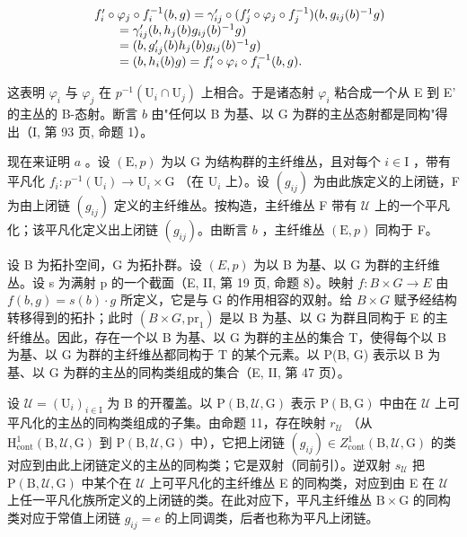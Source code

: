 \[
\begin{array}{r l} & f _ {i} ^ {\prime} \circ \varphi_ {j} \circ f _ {i} ^ {- 1} (b, g) = \gamma_ {i j} ^ {\prime} \circ (f _ {j} ^ {\prime} \circ \varphi_ {j} \circ f _ {j} ^ {- 1}) (b, g _ {i j} (b) ^ {- 1} g) \\ & \qquad = \gamma_ {i j} ^ {\prime} (b, h _ {j} (b) g _ {i j} (b) ^ {- 1} g) \\ & \qquad = (b, g _ {i j} ^ {\prime} (b) h _ {j} (b) g _ {i j} (b) ^ {- 1} g) \\ & \qquad = (b, h _ {i} (b) g) = f _ {i} ^ {\prime} \circ \varphi_ {i} \circ f _ {i} ^ {- 1} (b, g). \end{array}
\]

这表明 \(\varphi_{i}\) 与 \(\varphi_{j}\) 在 \(p^{-1}(\mathrm{U}_{i}\cap\mathrm{U}_{j})\) 上相合。于是诸态射 \(\varphi_{i}\) 粘合成一个从 E 到 E' 的主丛的 B-态射。断言 \(b\) 由"任何以 B 为基、以 G 为群的主丛态射都是同构"得出（I, 第 93 页, 命题 1）。

现在来证明 \(a\) 。设 \((\mathrm{E}, p)\) 为以 G 为结构群的主纤维丛，且对每个 \(i \in \mathrm{I}\) ，带有平凡化 \(f_i: p^{-1}(\mathrm{U}_i) \to \mathrm{U}_i \times \mathrm{G}\) （在 \(\mathrm{U}_i\) 上）。设 \((g_{ij})\) 为由此族定义的上闭链，F 为由上闭链 \((g_{ij})\) 定义的主纤维丛。按构造，主纤维丛 F 带有 \(\mathcal{U}\) 上的一个平凡化；该平凡化定义出上闭链 \((g_{ij})\)。由断言 \(b\) ，主纤维丛 \((\mathrm{E}, p)\) 同构于 F。

设 B 为拓扑空间，G 为拓扑群。设 \((E,p)\) 为以 B 为基、以 G 为群的主纤维丛。设 s 为满射 p 的一个截面（E, II, 第 19 页, 命题 8）。映射 \(f\colon B\times G\to E\) 由 \(f(b,g)=s(b)\cdot g\) 所定义，它是与 G 的作用相容的双射。给 \(B\times G\) 赋予经结构转移得到的拓扑；此时 \((B\times G,\mathrm{pr}_{1})\) 是以 B 为基、以 G 为群且同构于 E 的主纤维丛。因此，存在一个以 B 为基、以 G 为群的主丛的集合 T，使得每个以 B 为基、以 G 为群的主纤维丛都同构于 T 的某个元素。以 P(B, G) 表示以 B 为基、以 G 为群的主丛的同构类组成的集合（E, II, 第 47 页）。

设 \(\mathcal{U} = (\mathrm{U}_i)_{i\in \mathrm{I}}\) 为 B 的开覆盖。以 \(\mathrm{P(B,\mathcal{U},G)}\) 表示 \(\mathrm{P(B,G)}\) 中由在 \(\mathcal{U}\) 上可平凡化的主丛的同构类组成的子集。由命题 11，存在映射 \(r_{\mathcal{U}}\) （从 \(\mathrm{H}_{\mathrm{cont}}^{1}(\mathrm{B},\mathcal{U},\mathrm{G})\) 到 \(\mathrm{P(B,\mathcal{U},G)}\) 中），它把上闭链 \((g_{ij})\in Z_{\mathrm{cont}}^{1}(\mathrm{B},\mathcal{U},\mathrm{G})\) 的类对应到由此上闭链定义的主丛的同构类；它是双射（同前引）。逆双射 \(s_{\mathcal{U}}\) 把 \(\mathrm{P(B,\mathcal{U},G)}\) 中某个在 \(\mathcal{U}\) 上可平凡化的主纤维丛 E 的同构类，对应到由 E 在 \(\mathcal{U}\) 上任一平凡化族所定义的上闭链的类。在此对应下，平凡主纤维丛 \(\mathrm{B}\times \mathrm{G}\) 的同构类对应于常值上闭链 \(g_{ij} = e\) 的上同调类，后者也称为平凡上闭链。

